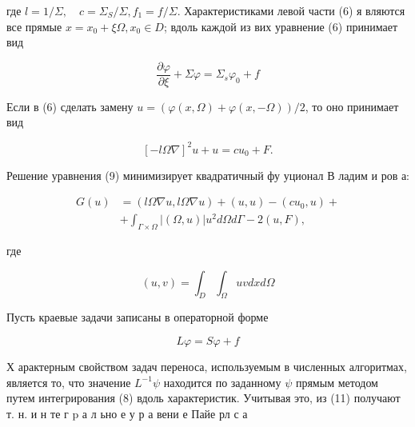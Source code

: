 \documentclass[10pt]{article}
\begin{document}
где $l=1 / \Sigma, \quad c=\Sigma_{S} / \Sigma, f_{1}=f / \Sigma$. Характеристиками левой части (6) я вляются все прямые $x=x_{0}+\xi \Omega, x_{0} \in D$; вдоль каждой из вих уравнение (6) принимает вид



\[

\frac{\partial \varphi}{\partial \xi}+\Sigma \varphi=\Sigma_{s} \varphi_{0}+f

\]



Если в (6) сделать замену $u=(\varphi(x, \Omega)+\varphi(x,-\Omega)) / 2$, то оно принимает вид



\[

[-l \Omega \nabla]^{2} u+u=c u_{0}+F .

\]



Решение уравнения (9) минимизирует квадратичный фу уционал В ладим и ров а:



\[

\begin{aligned}

G(u) & =(l \Omega \nabla u, l \Omega \nabla u)+(u, u)-\left(c u_{0}, u\right)+ \\

& +\int_{\Gamma \times \Omega}|(\Omega, u)| u^{2} d \Omega d \Gamma-2(u, F),

\end{aligned}

\]



где



\[

(u, v)=\int_{D} \int_{\Omega} u v d x d \Omega

\]



Пусть краевые задачи записаны в операторной форме



\[

L \varphi=S \varphi+f

\]



Х арактерным свойством задач переноса, используемым в численных алгоритмах, является то, что значение $L^{-1} \psi$ находится по заданному $\psi$ прямым методом путем интегрирования (8) вдоль характеристик. Учитывая это, из (11) получают т. н. и н те г p а л ьно е у р а вени е Пайе рл с а
\end{document}
